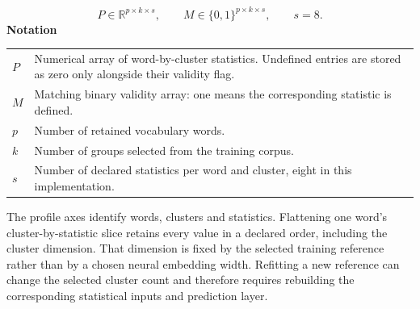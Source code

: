 \documentclass[10pt,letterpaper]{article}
\newcommand{\notlabel}{\noindent\textbf{Notation}\par\nobreak\vspace{4pt}}
\begin{document}
\par\noindent\begin{minipage}{\linewidth}
\begin{equation}\label{eq:behaviorprofile}
P\in\mathbb R^{p\times k\times s},\qquad M\in\{0,1\}^{p\times k\times s},\qquad s=8.
\end{equation}
\notlabel
{\fontsize{8.5}{10.5}\selectfont\setlength{\tabcolsep}{0pt}\renewcommand{\arraystretch}{1.12}
\begin{tabularx}{\linewidth}{@{}p{.14\linewidth}X@{}}
$P$ & Numerical array of word-by-cluster statistics. Undefined entries are stored as zero only alongside their validity flag.\\
$M$ & Matching binary validity array: one means the corresponding statistic is defined.\\
$p$ & Number of retained vocabulary words.\\
$k$ & Number of groups selected from the training corpus.\\
$s$ & Number of declared statistics per word and cluster, eight in this implementation.\\
\end{tabularx}}
\par\vspace{2pt}
\end{minipage}\par
The profile axes identify words, clusters and statistics. Flattening one word's cluster-by-statistic slice retains every value in a declared order, including the cluster dimension. That dimension is fixed by the selected training reference rather than by a chosen neural embedding width. Refitting a new reference can change the selected cluster count and therefore requires rebuilding the corresponding statistical inputs and prediction layer.\par
\end{document}
